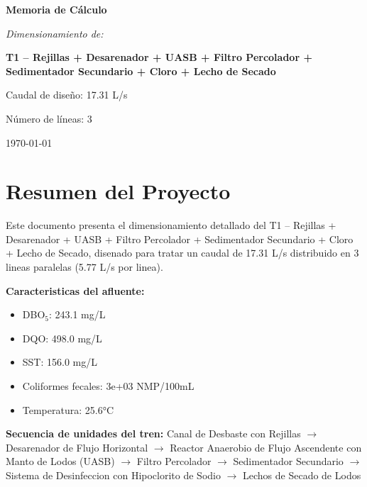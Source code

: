 \documentclass[12pt,a4paper]{article}
\begin{document}
\begin{titlepage}
\centering
\vspace*{2cm}

{\Huge\bfseries Memoria de Cálculo\par}
\vspace{1.5cm}

{\Large\itshape Dimensionamiento de:\par}
\vspace{0.5cm}

{\LARGE\bfseries T1 – Rejillas + Desarenador + UASB + Filtro Percolador + Sedimentador Secundario + Cloro + Lecho de Secado\par}
\vspace{2cm}

{\large Caudal de diseño: 17.31 L/s\par}
{\large Número de líneas: 3\par}
\vfill
{\large\today\par}
\end{titlepage}

\tableofcontents

\listoffigures

\listoftables

\newpage
\section{Resumen del Proyecto}

Este documento presenta el dimensionamiento detallado del T1 – Rejillas + Desarenador + UASB + Filtro Percolador + Sedimentador Secundario + Cloro + Lecho de Secado, disenado para tratar un caudal de 17.31 L/s distribuido en 3 lineas paralelas (5.77 L/s por linea).

\textbf{Caracteristicas del afluente:}
\begin{itemize}
    \item DBO$_5$: 243.1 mg/L
    \item DQO: 498.0 mg/L
    \item SST: 156.0 mg/L
    \item Coliformes fecales: 3e+03 NMP/100mL
    \item Temperatura: 25.6°C
\end{itemize}

\textbf{Secuencia de unidades del tren:} 
Canal de Desbaste con Rejillas $\rightarrow$ Desarenador de Flujo Horizontal $\rightarrow$ Reactor Anaerobio de Flujo Ascendente con Manto de Lodos (UASB) $\rightarrow$ Filtro Percolador $\rightarrow$ Sedimentador Secundario $\rightarrow$ Sistema de Desinfeccion con Hipoclorito de Sodio $\rightarrow$ Lechos de Secado de Lodos
\end{document}
